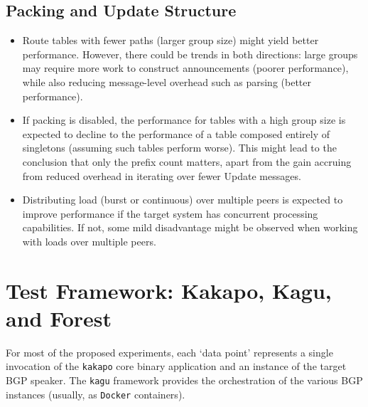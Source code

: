 \subsection{Packing and Update Structure}
\begin{itemize}
    \item Route tables with fewer paths (larger group size) might yield better performance. However, there could be trends in both directions: large groups may require more work to construct announcements (poorer performance), while also reducing message-level overhead such as parsing (better performance).
    \item If packing is disabled, the performance for tables with a high group size is expected to decline to the performance of a table composed entirely of singletons (assuming such tables perform worse). This might lead to the conclusion that only the prefix count matters, apart from the gain accruing from reduced overhead in iterating over fewer Update messages.
    \item Distributing load (burst or continuous) over multiple peers is expected to improve performance if the target system has concurrent processing capabilities. If not, some mild disadvantage might be observed when working with loads over multiple peers.
\end{itemize}

\section{Test Framework: Kakapo, Kagu, and Forest}

For most of the proposed experiments, each `data point' represents a single invocation of the \texttt{kakapo} core binary application and an instance of the target BGP speaker. The \texttt{kagu} framework provides the orchestration of the various BGP instances (usually, as \texttt{Docker} containers).

